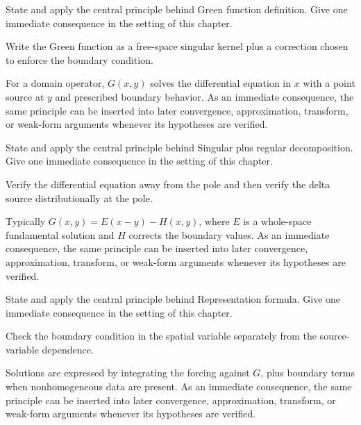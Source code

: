 \begin{exercise}\label{exr:iii25-01}
State and apply the central principle behind Green function definition. Give one immediate consequence in the setting of this chapter.
\end{exercise}
\begin{hint}
Write the Green function as a free-space singular kernel plus a correction chosen to enforce the boundary condition.
\end{hint}
\begin{solution}
For a domain operator, $G(x,y)$ solves the differential equation in $x$ with a point source at $y$ and prescribed boundary behavior. As an immediate consequence, the same principle can be inserted into later convergence, approximation, transform, or weak-form arguments whenever its hypotheses are verified.
\end{solution}

\begin{exercise}\label{exr:iii25-02}
State and apply the central principle behind Singular plus regular decomposition. Give one immediate consequence in the setting of this chapter.
\end{exercise}
\begin{hint}
Verify the differential equation away from the pole and then verify the delta source distributionally at the pole.
\end{hint}
\begin{solution}
Typically $G(x,y)=E(x-y)-H(x,y)$, where $E$ is a whole-space fundamental solution and $H$ corrects the boundary values. As an immediate consequence, the same principle can be inserted into later convergence, approximation, transform, or weak-form arguments whenever its hypotheses are verified.
\end{solution}

\begin{exercise}\label{exr:iii25-03}
State and apply the central principle behind Representation formula. Give one immediate consequence in the setting of this chapter.
\end{exercise}
\begin{hint}
Check the boundary condition in the spatial variable separately from the source-variable dependence.
\end{hint}
\begin{solution}
Solutions are expressed by integrating the forcing against $G$, plus boundary terms when nonhomogeneous data are present. As an immediate consequence, the same principle can be inserted into later convergence, approximation, transform, or weak-form arguments whenever its hypotheses are verified.
\end{solution}


